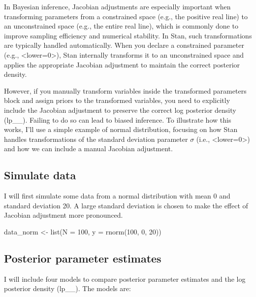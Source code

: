 \documentclass[
  letterpaper,
  DIV=11,
  numbers=noendperiod]{scrartcl}
\newenvironment{Shaded}{}{}
\newcommand{\AttributeTok}[1]{\textcolor[rgb]{0.65,0.15,0.64}{#1}}
\newcommand{\DecValTok}[1]{\textcolor[rgb]{0.60,0.41,0.00}{#1}}
\newcommand{\FunctionTok}[1]{\textcolor[rgb]{0.25,0.47,0.95}{#1}}
\newcommand{\NormalTok}[1]{\textcolor[rgb]{0.22,0.23,0.26}{#1}}
\newcommand{\OtherTok}[1]{\textcolor[rgb]{0.15,0.68,0.38}{#1}}
\begin{document}
In Bayesian inference, Jacobian adjustments are especially important
when transforming parameters from a constrained space (e.g., the
positive real line) to an unconstrained space (e.g., the entire real
line), which is commonly done to improve sampling efficiency and
numerical stability. In Stan, such transformations are typically handled
automatically. When you declare a constrained parameter (e.g.,
\textless lower=0\textgreater), Stan internally transforms it to an
unconstrained space and applies the appropriate Jacobian adjustment to
maintain the correct posterior density.

However, if you manually transform variables inside the transformed
parameters block and assign priors to the transformed variables, you
need to explicitly include the Jacobian adjustment to preserve the
correct log posterior density (lp\_\_). Failing to do so can lead to
biased inference. To illustrate how this works, I'll use a simple
example of normal distribution, focusing on how Stan handles
transformations of the standard deviation parameter \(\sigma\) (i.e.,
\textless lower=0\textgreater) and how we can include a manual Jacobian
adjustment.

\subsection{Simulate data}\label{simulate-data}

I will first simulate some data from a normal distribution with mean 0
and standard deviation 20. A large standard deviation is chosen to make
the effect of Jacobian adjustment more pronounced.

\begin{Shaded}
\begin{Highlighting}[]
\NormalTok{data\_norm }\OtherTok{\textless{}{-}} \FunctionTok{list}\NormalTok{(}\AttributeTok{N =} \DecValTok{100}\NormalTok{, }\AttributeTok{y =} \FunctionTok{rnorm}\NormalTok{(}\DecValTok{100}\NormalTok{, }\DecValTok{0}\NormalTok{, }\DecValTok{20}\NormalTok{))}
\end{Highlighting}
\end{Shaded}

\subsection{Posterior parameter
estimates}\label{posterior-parameter-estimates}

I will include four models to compare posterior parameter estimates and
the log posterior density (lp\_\_). The models are:
\end{document}
